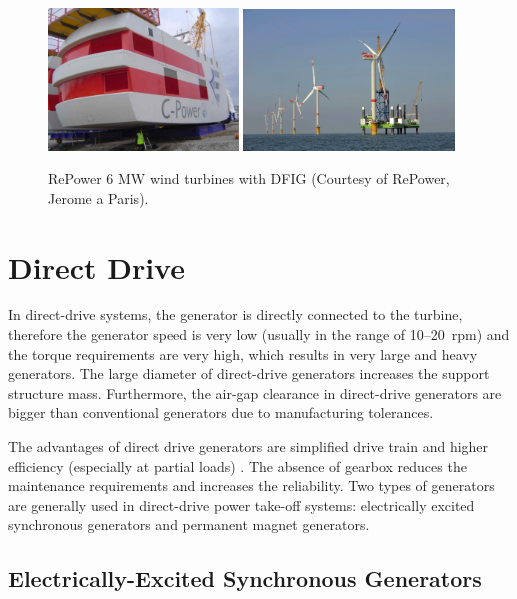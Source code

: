 \documentclass[a4paper, 11pt]{article} %
\begin{document}
\begin{figure}[]
  \centering
  \includegraphics[width=0.45\textwidth]{repower_nacelle}
  \hfill
    \includegraphics[width=0.5\textwidth]{repower_farm}
\caption{RePower 6 MW wind turbines with DFIG (Courtesy of RePower, Jerome a Paris).}
  \label{repower}
\end{figure}

\section{Direct Drive}

In direct-drive systems, the generator is directly connected to the turbine, therefore the generator speed is very low (usually in the range of 10--20~rpm) and the torque requirements are very high, which results in very large and heavy generators. The large diameter of direct-drive generators increases the support structure mass. Furthermore, the air-gap clearance in direct-drive generators are bigger than conventional generators due to manufacturing tolerances.

The advantages of direct drive generators are simplified drive train and higher efficiency (especially at partial loads) \cite{Li2008a}. The absence of gearbox reduces the maintenance requirements and increases the reliability. Two types of generators are generally used in direct-drive power take-off systems: electrically excited synchronous generators and permanent magnet generators. 

\subsection{Electrically-Excited Synchronous Generators}
\end{document}
